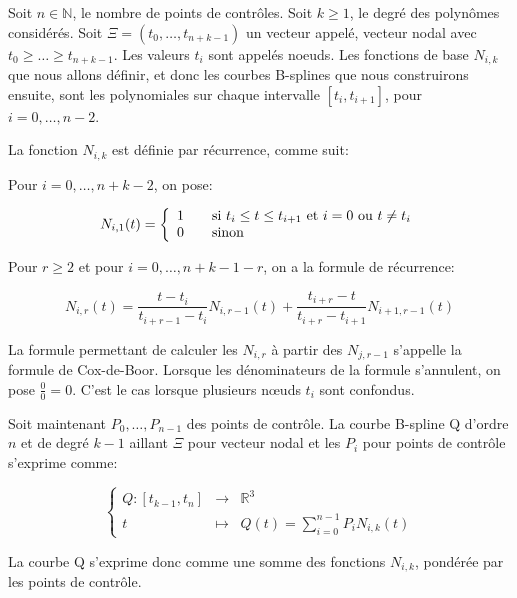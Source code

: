 \begin{mydef}\label{def:chap1_coxdeboor}
  Soit $n \in \mathbb{N}$, le nombre de points de contrôles. Soit $k
  \geq 1$, le degré des polynômes considérés. Soit $\Xi = (t_0, \dotsc,
  t_{n+k-1})$ un vecteur appelé, vecteur nodal avec $t_0 \geq \dotsc
  \geq t_{n+k-1}$. Les valeurs $t_i$ sont appelés noeuds. Les
  fonctions de base $N_{i,k}$ que nous allons définir, et donc les
  courbes B-splines que nous construirons ensuite, sont les
  polynomiales sur chaque intervalle $[t_i,t_{i+1}]$, pour $i =
  0,\dotsc,n-2$.

  La fonction $N_{i,k}$ est définie par récurrence,
  comme suit:

  Pour $i = 0, \dotsc, n+k-2$, on pose:

  \begin{equation}
    N_{i,1}(t) = \left\{
  \begin{array}{l l}
    1 & \quad \text{si $t_i \leq t \leq t_{i+1}$ et $i = 0$ ou $t \neq t_i$} \\
    0 & \quad \text{sinon} \\
  \end{array} \right.
  \end{equation}

  Pour $r \geq 2$ et pour $i = 0, \dotsc, n + k - 1 - r$, on a la
  formule de récurrence:

  \begin{equation}
    N_{i,r}(t) = \frac{t - t_i}{t_{i+r-1}-t_i} N_{i,r-1}(t) +
    \frac{t_{i+r} - t}{t_{i+r} - t_{i+1}} N_{i+1,r-1}(t)
  \end{equation}

  La formule permettant de calculer les $N_{i,r}$ à partir des
  $N_{j,r-1}$ s'appelle la formule de Cox-de-Boor. Lorsque les dénominateurs de la formule s'annulent,
  on pose $\frac{0}{0} = 0$. C'est le cas lorsque plusieurs n\oe uds
  $t_i$ sont confondus.

\end{mydef}

\begin{mydef}\label{def:chap1_spline}
  Soit maintenant $P_0, \dotsc, P_{n-1}$ des points de contrôle. La
  courbe B-spline Q d'ordre $n$ et de degré $k - 1$ aillant $\Xi$ pour
  vecteur nodal et les $P_i$ pour points de contrôle s'exprime comme:

  \begin{equation}
    \left\{
    \begin{array}{ccc}
      Q : [t_{k-1},t_n] & \rightarrow & \mathbb{R}^3\\
      t & \mapsto & Q(t) = \sum_{i=0}^{n-1} P_i N_{i,k}(t)
    \end{array}
    \right.
  \end{equation}

  La courbe Q s'exprime donc comme une somme des fonctions $N_{i,k}$,
  pondérée par les points de contrôle.
\end{mydef}


